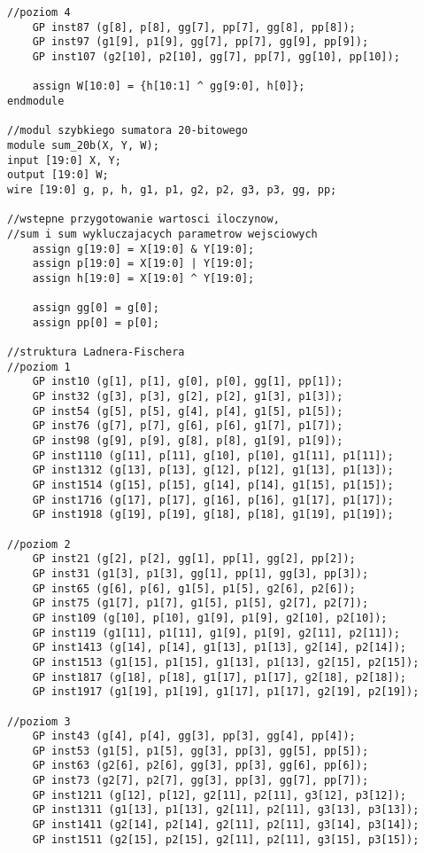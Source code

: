 \documentclass[a4paper]{article}
\begin{document}
\begin{lstlisting}[label=calosc]
//poziom 4
	GP inst87 (g[8], p[8], gg[7], pp[7], gg[8], pp[8]);
	GP inst97 (g1[9], p1[9], gg[7], pp[7], gg[9], pp[9]);
	GP inst107 (g2[10], p2[10], gg[7], pp[7], gg[10], pp[10]);
	
	assign W[10:0] = {h[10:1] ^ gg[9:0], h[0]};
endmodule

//modul szybkiego sumatora 20-bitowego
module sum_20b(X, Y, W);
input [19:0] X, Y;
output [19:0] W;
wire [19:0] g, p, h, g1, p1, g2, p2, g3, p3, gg, pp;

//wstepne przygotowanie wartosci iloczynow, 
//sum i sum wykluczajacych parametrow wejsciowych
	assign g[19:0] = X[19:0] & Y[19:0];
	assign p[19:0] = X[19:0] | Y[19:0];
	assign h[19:0] = X[19:0] ^ Y[19:0];

	assign gg[0] = g[0];
	assign pp[0] = p[0];

//struktura Ladnera-Fischera
//poziom 1
	GP inst10 (g[1], p[1], g[0], p[0], gg[1], pp[1]);
	GP inst32 (g[3], p[3], g[2], p[2], g1[3], p1[3]);
	GP inst54 (g[5], p[5], g[4], p[4], g1[5], p1[5]);
	GP inst76 (g[7], p[7], g[6], p[6], g1[7], p1[7]);
	GP inst98 (g[9], p[9], g[8], p[8], g1[9], p1[9]);
	GP inst1110 (g[11], p[11], g[10], p[10], g1[11], p1[11]);
	GP inst1312 (g[13], p[13], g[12], p[12], g1[13], p1[13]);
	GP inst1514 (g[15], p[15], g[14], p[14], g1[15], p1[15]);
	GP inst1716 (g[17], p[17], g[16], p[16], g1[17], p1[17]);
	GP inst1918 (g[19], p[19], g[18], p[18], g1[19], p1[19]);

//poziom 2
	GP inst21 (g[2], p[2], gg[1], pp[1], gg[2], pp[2]);
	GP inst31 (g1[3], p1[3], gg[1], pp[1], gg[3], pp[3]);
	GP inst65 (g[6], p[6], g1[5], p1[5], g2[6], p2[6]);
	GP inst75 (g1[7], p1[7], g1[5], p1[5], g2[7], p2[7]);
	GP inst109 (g[10], p[10], g1[9], p1[9], g2[10], p2[10]);
	GP inst119 (g1[11], p1[11], g1[9], p1[9], g2[11], p2[11]);
	GP inst1413 (g[14], p[14], g1[13], p1[13], g2[14], p2[14]);
	GP inst1513 (g1[15], p1[15], g1[13], p1[13], g2[15], p2[15]);
	GP inst1817 (g[18], p[18], g1[17], p1[17], g2[18], p2[18]);
	GP inst1917 (g1[19], p1[19], g1[17], p1[17], g2[19], p2[19]);

//poziom 3
	GP inst43 (g[4], p[4], gg[3], pp[3], gg[4], pp[4]);
	GP inst53 (g1[5], p1[5], gg[3], pp[3], gg[5], pp[5]);
	GP inst63 (g2[6], p2[6], gg[3], pp[3], gg[6], pp[6]);
	GP inst73 (g2[7], p2[7], gg[3], pp[3], gg[7], pp[7]);
	GP inst1211 (g[12], p[12], g2[11], p2[11], g3[12], p3[12]);
	GP inst1311 (g1[13], p1[13], g2[11], p2[11], g3[13], p3[13]);
	GP inst1411 (g2[14], p2[14], g2[11], p2[11], g3[14], p3[14]);
	GP inst1511 (g2[15], p2[15], g2[11], p2[11], g3[15], p3[15]);


\end{lstlisting}
\end{document}
